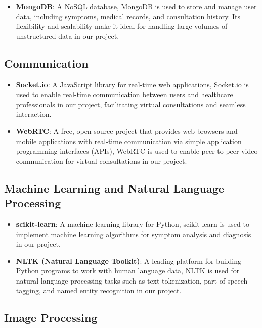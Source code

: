 \documentclass[onecolumn]{article}
\begin{document}
\begin{itemize}
\item \textbf{MongoDB}: A NoSQL database, MongoDB is used to store and manage user data, including symptoms, medical records, and consultation history. Its flexibility and scalability make it ideal for handling large volumes of unstructured data in our project.
\end{itemize}

\subsection{Communication}

\begin{itemize}
\item \textbf{Socket.io}: A JavaScript library for real-time web applications, Socket.io is used to enable real-time communication between users and healthcare professionals in our project, facilitating virtual consultations and seamless interaction.
\item \textbf{WebRTC}: A free, open-source project that provides web browsers and mobile applications with real-time communication via simple application programming interfaces (APIs), WebRTC is used to enable peer-to-peer video communication for virtual consultations in our project.
\end{itemize}

\subsection{Machine Learning and Natural Language Processing}

\begin{itemize}
\item \textbf{scikit-learn}: A machine learning library for Python, scikit-learn is used to implement machine learning algorithms for symptom analysis and diagnosis in our project.
\item \textbf{NLTK (Natural Language Toolkit)}: A leading platform for building Python programs to work with human language data, NLTK is used for natural language processing tasks such as text tokenization, part-of-speech tagging, and named entity recognition in our project.
\end{itemize}

\subsection{Image Processing}
\end{document}
